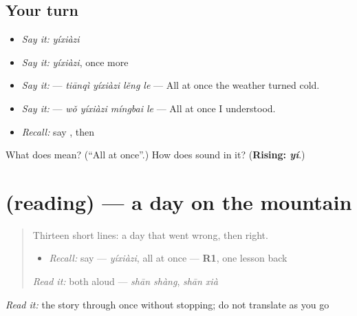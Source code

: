 \subsection*{Your turn}
\begin{itemize}
\raggedright
  \item \emph{Say it:} \emph{yíxiàzi}
  \item \emph{Say it:} \emph{yíxiàzi}, once more
  \item \emph{Say it:}  — \emph{tiānqì yíxiàzi lěng le} — All at once the weather turned cold.
  \item \emph{Say it:}  — \emph{wǒ yíxiàzi míngbai le} — All at once I understood.
  \item \emph{Recall:} say , then 
\end{itemize}

\begin{tcolorbox}[breakable,colback=teal!4,colframe=teal!35!black,title={Before you move on}]
What does  mean? (\textquotedblleft{}All at once\textquotedblright{}.) How does  sound in it? (\textbf{Rising: \emph{yí}}.)
\end{tcolorbox}
\section[(reading)]{(reading) — a day on the mountain}

\label{lesson:ZH-C279-reading}



\begin{quote}
Thirteen short lines: a day that went wrong, then right.

\begin{itemize}
\raggedright
  \item \emph{Recall:} say  — \emph{yíxiàzi}, all at once — \textbf{R1}, one lesson back
\end{itemize}

\begin{quote}
 
\end{quote}

\emph{Read it:} both aloud — \emph{shān shàng}, \emph{shān xià}
\end{quote}

\begin{tcolorbox}[breakable,skin=enhanced,colback=orange!6,colframe=orange!45!black,boxrule=0.5pt,arc=1mm,left=6pt,right=6pt,top=4pt,bottom=4pt,fonttitle=\bfseries,title={Read this}]
\begin{quote}
                      
\end{quote}

\emph{Read it:} the story through once without stopping; do not translate as you go
\end{tcolorbox}


